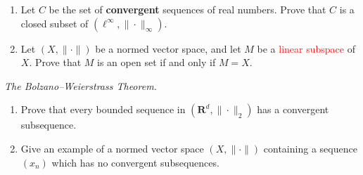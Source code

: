 \documentclass{article}
\newcommand{\R}{\mathbf{R}}
\theoremstyle{plain} %
\numberwithin{thm}{section} %
\theoremstyle{definition}
\begin{document}
\begin{enumerate}[label=(\alph*)]
\begin{proof}
            Let \(h(x) = f(x) - g_n(x)\). We try to maximize \(|h(x)|\). Taking its derivative with respect to \(x\), we get
            \[
                h^\prime(x) = f^\prime(x) - g_n^\prime(x) = \frac{x-\frac{1}{2}}{|x-\frac{1}{2}|} - \frac{e^{-\frac{n}{x}}-e^{-\frac{n}{1-x}}}{e^{-\frac{n}{x}}+e^{-\frac{n}{1-x}}}
            \]
            There is a critical point at \(x = \frac{1}{2}\) since \(h^\prime(\frac{1}{2})\) is undefined. Otherwise, if \(x > \frac{1}{2}\),
            \[
                h^\prime(x) = 1 - \frac{e^{-\frac{n}{x}}-e^{-\frac{n}{1-x}}}{e^{-\frac{n}{x}}+e^{-\frac{n}{1-x}}} = \frac{2e^{-\frac{n}{1-x}}}{e^{-\frac{n}{x}}+e^{-\frac{n}{1-x}}} > 0
            \]
            If \(x < 0\),
            \[
                h^\prime(x) = -1 - \frac{e^{-\frac{n}{x}}-e^{-\frac{n}{1-x}}}{e^{-\frac{n}{x}}+e^{-\frac{n}{1-x}}} = \frac{-2e^{-\frac{n}{x}}}{e^{-\frac{n}{x}}+e^{-\frac{n}{1-x}}} < 0
            \]
            Checking all critical points and endpoints, we see that
            \[
                h(\frac{1}{2}) = 0
                h(0) = 
            \]
            
        \end{proof}

        \item Let $C$ be the set of \textbf{convergent} sequences of real numbers. Prove that $C$ is a closed subset of $(\ell^\infty,\|\cdot\|_\infty)$.

        \item Let $(X,\|\cdot\|)$ be a normed vector space, and let $M$ be a \textcolor{red}{linear subspace} of $X$. Prove that $M$ is an open set if and only if $M=X$.
    \end{enumerate}

    \exercise \textit{The Bolzano--Weierstrass Theorem.}

    \begin{enumerate}[label=(\alph*)]
        \item Prove that every bounded sequence in $(\R^d,\|\cdot\|_2)$ has a convergent subsequence.
        \item Give an example of a normed vector space $(X,\|\cdot\|)$ containing a sequence $(x_n)$ which has no convergent subsequences.
    \end{enumerate}
\end{document}
